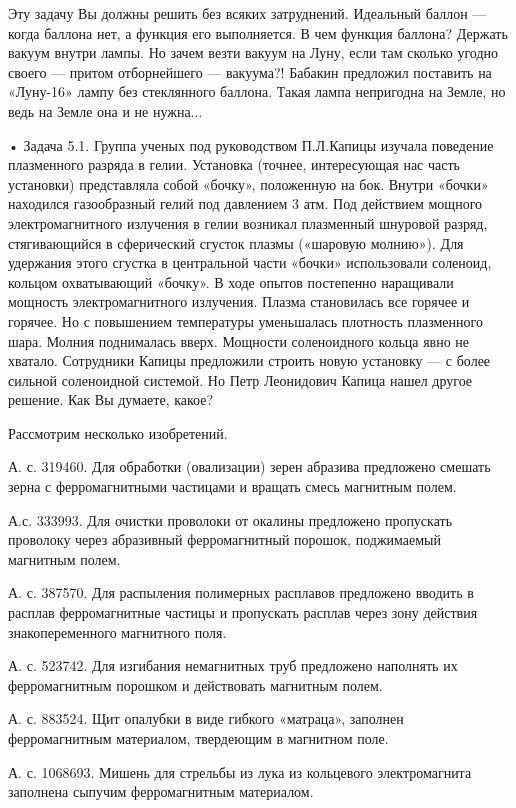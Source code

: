 Эту задачу Вы должны решить без всяких затруднений. Идеальный баллон —
когда баллона нет,  а функция его выполняется. В  чем функция баллона?
Держать вакуум внутри  лампы. Но зачем везти вакуум на  Луну, если там
сколько  угодно  своего  —  притом отборнейшего  —  вакуума?!  Бабакин
предложил поставить на «Луну-16»  лампу без стеклянного баллона. Такая
лампа непригодна на Земле, но ведь на Земле она и не нужна...


•  Задача  5.1.  Группа  ученых под  руководством  П.Л.Капицы  изучала
поведение плазменного разряда в гелии. Установка (точнее, интересующая
нас часть  установки) представляла  собой «бочку», положенную  на бок.
Внутри  «бочки»  находился газообразный  гелий  под  давлением 3  атм.
Под  действием мощного  электромагнитного излучения  в гелии  возникал
плазменный шнуровой разряд, стягивающийся в сферический сгусток плазмы
(«шаровую молнию»).  Для удержания  этого сгустка в  центральной части
«бочки» использовали  соленоид, кольцом  охватывающий «бочку».  В ходе
опытов  постепенно  наращивали мощность  электромагнитного  излучения.
Плазма становилась все горячее и  горячее. Но с повышением температуры
уменьшалась  плотность  плазменного  шара. Молния  поднималась  вверх.
Мощности  соленоидного  кольца  явно  не  хватало.  Сотрудники  Капицы
предложили  строить  новую установку  —  с  более сильной  соленоидной
системой.  Но Петр  Леонидович  Капица нашел  другое  решение. Как  Вы
думаете, какое?


Рассмотрим несколько изобретений.

А.  с. 319460.  Для обработки  (овализации) зерен  абразива предложено
смешать зерна  с ферромагнитными  частицами и вращать  смесь магнитным
полем.

А.с. 333993.  Для очистки  проволоки от окалины  предложено пропускать
проволоку   через  абразивный   ферромагнитный  порошок,   поджимаемый
магнитным полем.

А. с.  387570. Для распыления полимерных  расплавов предложено вводить
в  расплав  ферромагнитные частицы  и  пропускать  расплав через  зону
действия знакопеременного магнитного поля.

А. с. 523742.  Для изгибания немагнитных труб  предложено наполнять их
ферромагнитным порошком и действовать магнитным полем.

А.  с.  883524.  Щит  опалубки  в  виде  гибкого  «матраца»,  заполнен
ферромагнитным материалом, твердеющим в магнитном поле.

А.   с.  1068693.   Мишень  для   стрельбы  из   лука  из   кольцевого
электромагнита заполнена сыпучим ферромагнитным материалом.

